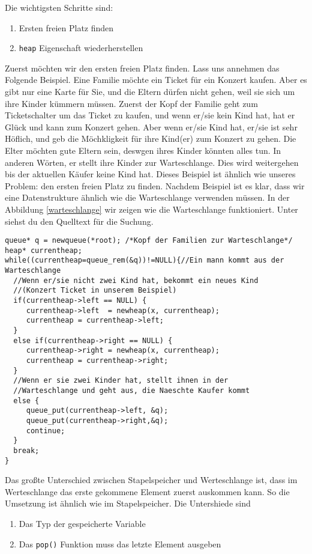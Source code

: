 Die wichtigsten Schritte sind:
\begin{enumerate}
\item Ersten freien Platz finden
\item \texttt{heap} Eigenschaft wiederherstellen
\end{enumerate}
Zuerst möchten wir den ersten freien Platz finden. Lass uns annehmen
das Folgende Beispiel. Eine Familie möchte ein Ticket für ein Konzert kaufen.
Aber es gibt nur eine Karte für Sie, und die Eltern dürfen nicht gehen, weil sie sich 
um ihre Kinder kümmern müssen. Zuerst der Kopf der Familie geht zum Ticketschalter
um das Ticket zu kaufen, und wenn er/sie  kein Kind hat, hat er Glück und
kann zum Konzert gehen. Aber wenn er/sie Kind hat, er/sie ist sehr Höflich, und 
geb die Möchkligkeit für ihre Kind(er) zum Konzert zu gehen. Die Elter möchten 
gute Eltern sein, deswgen ihres Kinder könnten alles tun. In anderen Wörten, er
stellt ihre Kinder zur Warteschlange. Dies wird weitergehen bis der aktuellen Käufer 
keine Kind hat. Dieses Beispiel ist ähnlich wie unseres Problem: den ersten freien 
Platz zu finden. Nachdem Beispiel ist es klar, dass wir eine Datenstrukture ähnlich wie 
die Warteschlange verwenden müssen. In der Abbildung \ref{warteschlange} wir zeigen wie 
die Warteschlange funktioniert. Unter siehst du den Quelltext für die Suchung.


\begin{lstlisting}
queue* q = newqueue(*root); /*Kopf der Familien zur Warteschlange*/
heap* currentheap; 
while((currentheap=queue_rem(&q))!=NULL){//Ein mann kommt aus der Warteschlange
  //Wenn er/sie nicht zwei Kind hat, bekommt ein neues Kind
  //(Konzert Ticket in unserem Beispiel)
  if(currentheap->left == NULL) {
     currentheap->left  = newheap(x, currentheap);
     currentheap = currentheap->left;
  }
  else if(currentheap->right == NULL) {
     currentheap->right = newheap(x, currentheap);
     currentheap = currentheap->right;
  }
  //Wenn er sie zwei Kinder hat, stellt ihnen in der 
  //Warteschlange und geht aus, die Naeschte Kaufer kommt
  else {
     queue_put(currentheap->left, &q);
     queue_put(currentheap->right,&q);
     continue;
  }
  break;
}
\end{lstlisting}


Das großte Unterschied zwischen Stapelspeicher und 
Werteschlange ist, dass im Werteschlange das erste gekommene Element zuerst auskommen kann. 
So die Umsetzung ist ähnlich wie im Stapelspeicher. Die Untershiede sind
\begin{enumerate}
\item Das Typ der gespeicherte Variable
\item Das \texttt{pop()} Funktion muss das letzte Element ausgeben
\end{enumerate}

